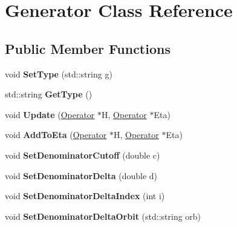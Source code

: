 \hypertarget{classGenerator}{}\section{Generator Class Reference}
\label{classGenerator}
\subsection*{Public Member Functions}
\begin{DoxyCompactItemize}
\item 
\mbox{\label{classGenerator_a3b63c899accca1c8e51a3b73ab965683}} 
void {\bfseries Set\+Type} (std\+::string g)
\item 
\mbox{\label{classGenerator_acbfbb548a631ffa502ebab9e23b45081}} 
std\+::string {\bfseries Get\+Type} ()
\item 
\mbox{\label{classGenerator_a34d64ff0bc9a6a68799ac0f8f23d85ca}} 
void {\bfseries Update} (\hyperlink{classOperator}{Operator} $\ast$H, \hyperlink{classOperator}{Operator} $\ast$Eta)
\item 
\mbox{\label{classGenerator_ae4c71c9c1e9b75f31a56c1b29fe8d5e3}} 
void {\bfseries Add\+To\+Eta} (\hyperlink{classOperator}{Operator} $\ast$H, \hyperlink{classOperator}{Operator} $\ast$Eta)
\item 
\mbox{\label{classGenerator_a53963baf40f105d654c914a4474eb3b2}} 
void {\bfseries Set\+Denominator\+Cutoff} (double c)
\item 
\mbox{\label{classGenerator_a9b13eb1c9f3d6bb6744802b3d355fc31}} 
void {\bfseries Set\+Denominator\+Delta} (double d)
\item 
\mbox{\label{classGenerator_a46d87d44e5b372e0571a14512d8aa62c}} 
void {\bfseries Set\+Denominator\+Delta\+Index} (int i)
\item 
\mbox{\label{classGenerator_a9f349812a02ee31d54e166f949aef201}} 
void {\bfseries Set\+Denominator\+Delta\+Orbit} (std\+::string orb)
\item 
\mbox{\label{classGenerator_a892b11aeb7bd1e154d8c871e0b8d923e}} 

\end{DoxyCompactItemize}
